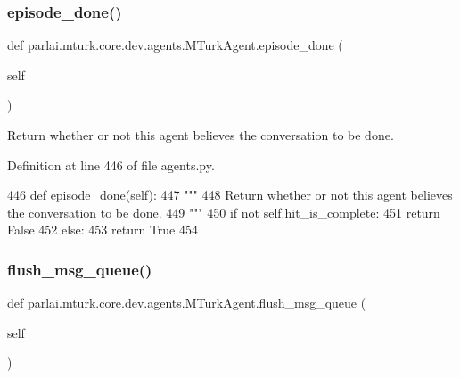 \subsubsection{\texorpdfstring{episode\+\_\+done()}{episode\_done()}}
{\footnotesize\ttfamily def parlai.\+mturk.\+core.\+dev.\+agents.\+M\+Turk\+Agent.\+episode\+\_\+done (\begin{DoxyParamCaption}\item[{}]{self }\end{DoxyParamCaption})}

\begin{DoxyVerb}Return whether or not this agent believes the conversation to be done.
\end{DoxyVerb}
 

Definition at line 446 of file agents.\+py.


\begin{DoxyCode}
446     \textcolor{keyword}{def }episode\_done(self):
447         \textcolor{stringliteral}{"""}
448 \textcolor{stringliteral}{        Return whether or not this agent believes the conversation to be done.}
449 \textcolor{stringliteral}{        """}
450         \textcolor{keywordflow}{if} \textcolor{keywordflow}{not} self.hit\_is\_complete:
451             \textcolor{keywordflow}{return} \textcolor{keyword}{False}
452         \textcolor{keywordflow}{else}:
453             \textcolor{keywordflow}{return} \textcolor{keyword}{True}
454 
\end{DoxyCode}
\mbox{\label{classparlai_1_1mturk_1_1core_1_1dev_1_1agents_1_1MTurkAgent_ac7a88bfcda18d7ac1862e09042cf6bd6}} 
\subsubsection{\texorpdfstring{flush\+\_\+msg\+\_\+queue()}{flush\_msg\_queue()}}
{\footnotesize\ttfamily def parlai.\+mturk.\+core.\+dev.\+agents.\+M\+Turk\+Agent.\+flush\+\_\+msg\+\_\+queue (\begin{DoxyParamCaption}\item[{}]{self }\end{DoxyParamCaption})}

